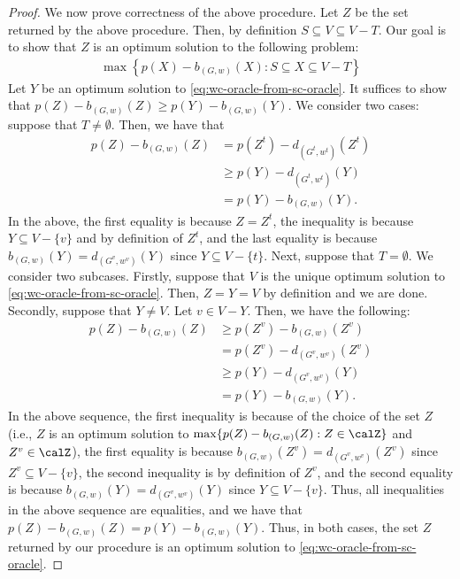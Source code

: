 \begin{proof}
We now prove correctness of the above procedure. Let $Z$ be the set returned by the above procedure. Then, by definition $S\subseteq V\subseteq V-T$. Our goal is to show that $Z$ is an optimum solution to the following problem:
\begin{align}
    \max\left\{p(X)-b_{(G, w)}(X): S\subseteq X\subseteq V-T\right\} \label{eq:wc-oracle-from-sc-oracle}
\end{align}
Let $Y$ be an optimum solution to \eqref{eq:wc-oracle-from-sc-oracle}. It suffices to show that $p(Z)-b_{(G, w)}(Z) \ge p(Y)-b_{(G, w)}(Y) $.   
We consider two cases: suppose that $T\neq \emptyset$. Then, we have that 
\begin{align*}
p(Z)-b_{(G, w)}(Z)
&=p(Z^t)-d_{(G^t, w^t)}(Z^t)\\
&\ge p(Y)-d_{(G^t, w^t)}(Y) \\
&= p(Y) - b_{(G, w)}(Y) .
\end{align*} 
In the above, the first equality is because $Z=Z^t$, the inequality is because $Y\subseteq V-\{v\}$ and by definition of $Z^t$, and the last equality is because $b_{(G, w)}(Y) = d_{(G^v, w^v)}(Y)$ since $Y\subseteq V-\{t\}$. 
Next, suppose that $T=\emptyset$. We consider two subcases. Firstly, suppose that $V$ is the unique optimum solution to \eqref{eq:wc-oracle-from-sc-oracle}. Then, $Z=Y=V$ by definition and we are done. 
Secondly, suppose that $Y\neq V$. Let $v\in V-Y$.  
Then, we have the following:
\begin{align*}
p(Z)-b_{(G, w)}(Z)
&\ge p(Z^v) - b_{(G, w)}(Z^v) \\
&=p(Z^v)-d_{(G^v, w^v)}(Z^v) \\
&\ge p(Y)-d_{(G^v, w^v)}(Y) \\
&=p(Y)-b_{(G, w)}(Y).
\end{align*} 
In the above sequence, the first inequality is because of the choice of the set $Z$ (i.e., $Z$ is an optimum solution to $\max\{p(Z)-b_{(G, w)}(Z): Z\in \calZ\}$ and $Z^v \in \calZ$), the first equality is because  $b_{(G, w)}(Z^v) = d_{(G^v, w^v)}(Z^v)$ since $Z^v\subseteq V-\{v\}$, the second inequality is by definition of $Z^v$, and the second equality is because $b_{(G, w)}(Y) = d_{(G^v, w^v)}(Y)$ since $Y\subseteq V-\{v\}$. Thus, all inequalities in the above sequence are equalities, and we have that $p(Z)-b_{(G, w)}(Z) = p(Y)-b_{(G, w)}(Y)$. Thus, in both cases, the set $Z$ returned by our procedure is an optimum solution to \eqref{eq:wc-oracle-from-sc-oracle}.


\end{proof}
